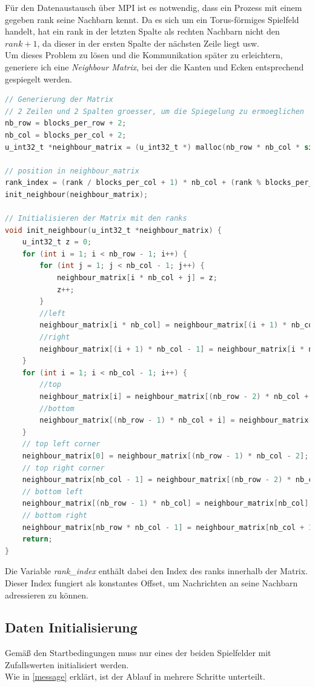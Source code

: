 \documentclass[german,plainarticle,hyperref,utf8]{zihpub}
\begin{document}
	Für den Datenaustausch über MPI ist es notwendig, dass ein Prozess mit einem gegeben rank seine Nachbarn kennt. Da es sich um ein Torus-förmiges Spielfeld handelt, hat ein rank in der letzten Spalte als rechten Nachbarn nicht den $rank + 1$, da dieser in der ersten Spalte der nächsten Zeile liegt usw.\\
	Um dieses Problem zu lösen und die Kommunikation später zu erleichtern, generiere ich eine \textit{Neighbour Matrix}, bei der die Kanten und Ecken entsprechend gespiegelt werden.
	\begin{lstlisting}[language=C, caption=Generierung der Neighbour Matrix]
// Generierung der Matrix
// 2 Zeilen und 2 Spalten groesser, um die Spiegelung zu ermoeglichen
nb_row = blocks_per_row + 2;
nb_col = blocks_per_col + 2;
u_int32_t *neighbour_matrix = (u_int32_t *) malloc(nb_row * nb_col * sizeof(u_int32_t));

// position in neighbour_matrix
rank_index = (rank / blocks_per_col + 1) * nb_col + (rank % blocks_per_col + 1);
init_neighbour(neighbour_matrix);

// Initialisieren der Matrix mit den ranks
void init_neighbour(u_int32_t *neighbour_matrix) {
	u_int32_t z = 0;
	for (int i = 1; i < nb_row - 1; i++) {
		for (int j = 1; j < nb_col - 1; j++) {
			neighbour_matrix[i * nb_col + j] = z;
			z++;
		}
		//left
		neighbour_matrix[i * nb_col] = neighbour_matrix[(i + 1) * nb_col - 2];
		//right
		neighbour_matrix[(i + 1) * nb_col - 1] = neighbour_matrix[i * nb_col + 1];
	}
	for (int i = 1; i < nb_col - 1; i++) {
		//top
		neighbour_matrix[i] = neighbour_matrix[(nb_row - 2) * nb_col + i];
		//bottom
		neighbour_matrix[(nb_row - 1) * nb_col + i] = neighbour_matrix[nb_col + i];
	}
	// top left corner
	neighbour_matrix[0] = neighbour_matrix[(nb_row - 1) * nb_col - 2];
	// top right corner
	neighbour_matrix[nb_col - 1] = neighbour_matrix[(nb_row - 2) * nb_col + 1];
	// bottom left
	neighbour_matrix[(nb_row - 1) * nb_col] = neighbour_matrix[nb_col];
	// bottom right
	neighbour_matrix[nb_row * nb_col - 1] = neighbour_matrix[nb_col + 1];
	return;
}\end{lstlisting}

	Die Variable \textit{rank\_index} enthält dabei den Index des ranks innerhalb der Matrix. Dieser Index fungiert als konstantes Offset, um Nachrichten an seine Nachbarn adressieren zu können.


	\subsection{Daten Initialisierung} \label{data_init}
	Gemäß den Startbedingungen muss nur eines der beiden Spielfelder mit Zufallswerten initialisiert werden.\\
	Wie in \ref{message} erklärt, ist der Ablauf in mehrere Schritte unterteilt.
	
\end{document}
